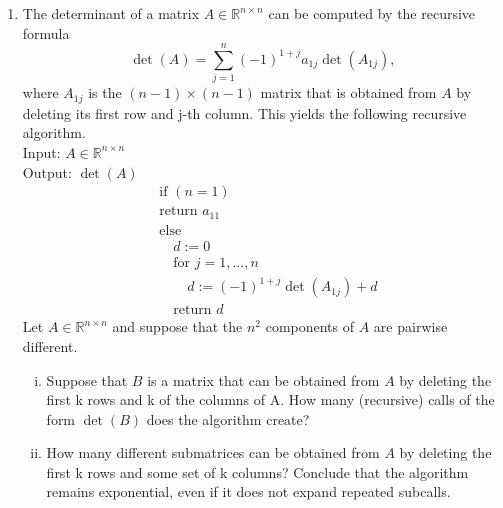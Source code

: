 \documentclass[11pt]{article}
\newcommand{\setR}{\mathbb{R}}
\begin{document}
\begin{enumerate}[1)]
\item The determinant of a matrix $A∈\setR^{n×n}$ can be computed by the recursive formula
$$\det(A) = \displaystyle\sum_{j=1}^n (-1)^{1+j} a_{1j}\det(A_{1j}), $$
where $A_{1j}$ is the $(n−1)\times(n−1)$ matrix that is obtained from $A$ by deleting its first row and j-th
column. This yields the following recursive algorithm.\\
Input: $A∈\setR^{n×n}$ \\
Output: $\det(A)$\\
\begin{align*}
& \text{if } (n= 1) \\
&\text{return }a_{11}\\
&\text{else} \\
& \quad d:= 0\\
& \quad\text{for }j = 1,...,n\\
& \quad \quad d:= (−1)^{1+j} \det(A_{1j} ) + d \\
&\quad \text{return }d
\end{align*}
Let $A∈\setR^{n×n}$ and suppose that the $n^2$ components of $A$ are pairwise diﬀerent.
\begin{enumerate}[i)]
\item Suppose that $B$ is a matrix that can be obtained from $A$ by deleting the first k rows and k of
the columns of A. How many (recursive) calls of the form $\det(B)$ does the algorithm create?
\item How many diﬀerent submatrices can be obtained from $A$ by deleting the first k rows and some
set of k columns? Conclude that the algorithm remains exponential, even if it does not expand
repeated subcalls.
\end{enumerate}


\end{enumerate}



  
\end{document}
